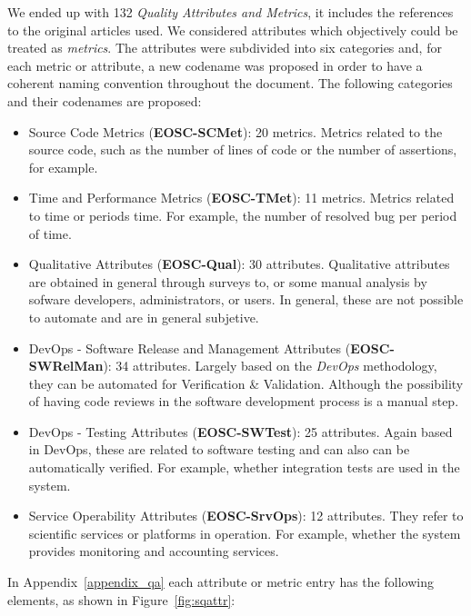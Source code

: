 We ended up with 132 \textit{Quality Attributes and Metrics}, it includes the references to the original articles used. We considered attributes which objectively could be treated as \textit{metrics}. The attributes were subdivided into six categories and, for each metric or attribute, a new codename was proposed in order to have a coherent naming convention throughout the document. The following categories and their codenames are proposed:

\begin{itemize}
    \item Source Code Metrics (\textbf{EOSC-SCMet}): 20 metrics. Metrics related to the source code, such as the number of lines of code or the number of assertions, for example.

    \item Time and Performance Metrics (\textbf{EOSC-TMet}): 11 metrics. Metrics related to time or periods time. For example, the number of resolved bug per period of time.

    \item Qualitative Attributes (\textbf{EOSC-Qual}): 30 attributes. Qualitative attributes are obtained in general through surveys to, or some manual analysis by sofware developers, administrators, or users. In general, these are not possible to automate and are in general subjetive.

    \item DevOps - Software Release and Management Attributes (\textbf{EOSC-SWRelMan}): 34 attributes. Largely based on the \textit{DevOps} methodology, they can be automated for Verification \& Validation. Although the possibility of having code reviews in the software development process is a manual step.

    \item DevOps - Testing Attributes (\textbf{EOSC-SWTest}): 25 attributes. Again based in DevOps, these are related to software testing and can also can be automatically verified. For example, whether integration tests are used in the system.

    \item Service Operability Attributes (\textbf{EOSC-SrvOps}): 12 attributes. They refer to scientific services or platforms in operation. For example, whether the system provides monitoring and accounting services.
\end{itemize}

In Appendix~\ref{appendix_qa} each attribute or metric entry has the following elements, as shown in Figure~\ref{fig:sqattr}:

